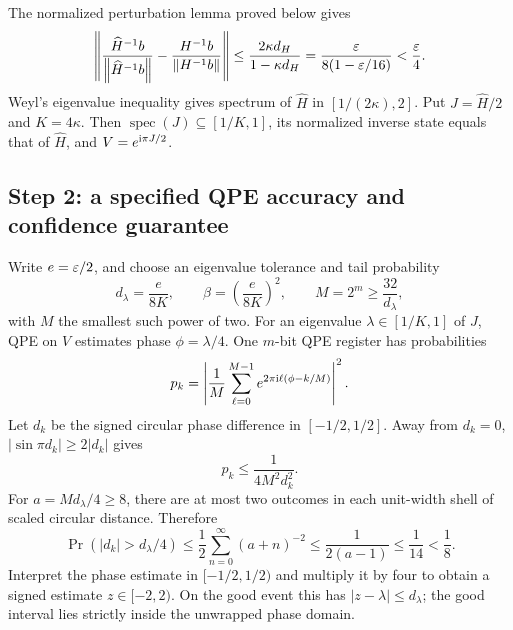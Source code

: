 The normalized perturbation lemma proved below gives
\begin{equation}
 \left\lVert \frac{\widehat H^{-1}b}{\left\lVert \widehat H^{-1}b\right\rVert}-
 \frac{H^{-1}b}{\left\lVert H^{-1}b\right\rVert}\right\rVert
 \leq\frac{2\kappa d_H}{1-\kappa d_H}
 =\frac{\varepsilon}{8(1-\varepsilon/16)}<\frac{\varepsilon}{4}.
\end{equation}
Weyl's eigenvalue inequality gives spectrum of $\widehat H$ in $[1/(2\kappa),2]$. Put $J=\widehat H/2$ and $K=4\kappa$. Then $\operatorname{spec}(J)\subseteq[1/K,1]$, its normalized inverse state equals that of $\widehat H$, and $V=e^{\mathrm{i}\pi J/2}$.

\subsection{Step 2: a specified QPE accuracy and confidence guarantee}
Write $e=\varepsilon/2$, and choose an eigenvalue tolerance and tail probability
\begin{equation}
 d_\lambda=\frac{e}{8K},\qquad \beta=\left(\frac{e}{8K}\right)^2,
 \qquad M=2^m\geq\frac{32}{d_\lambda},
\end{equation}
with $M$ the smallest such power of two. For an eigenvalue $\lambda\in[1/K,1]$ of $J$, QPE on $V$ estimates phase $\phi=\lambda/4$. One $m$-bit QPE register has probabilities
\begin{equation}
 p_k=\left|\frac{1}{M}\sum_{\ell=0}^{M-1}
 e^{2\pi\mathrm{i}\ell(\phi-k/M)}\right|^2.
\end{equation}
Let $d_k$ be the signed circular phase difference in $[-1/2,1/2]$. Away from $d_k=0$, $|\sin\pi d_k|\geq2|d_k|$ gives
\begin{equation}
 p_k\leq\frac{1}{4M^2d_k^2}.
\end{equation}
For $a=M d_\lambda/4\geq8$, there are at most two outcomes in each unit-width shell of scaled circular distance. Therefore
\begin{equation}
 \Pr(|d_k|>d_\lambda/4)
 \leq\frac12\sum_{n=0}^{\infty}(a+n)^{-2}
 \leq\frac{1}{2(a-1)}\leq\frac1{14}<\frac18.
\end{equation}
Interpret the phase estimate in $[-1/2,1/2)$ and multiply it by four to obtain a signed estimate $z\in[-2,2)$. On the good event this has $|z-\lambda|\leq d_\lambda$; the good interval lies strictly inside the unwrapped phase domain.

